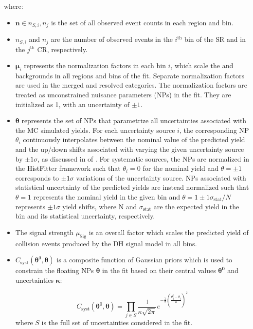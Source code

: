 where:

\begin{itemize}
    \item \(\boldsymbol{n}\in{n_{S,i}, n_j}\) is the set of all observed event counts in each region and bin.
    \item \(n_{S,i}\) and \(n_j\) are the number of observed events in the \(i^\text{th}\) bin of the SR and in the \(j^\text{th}\) CR, respectively.
    \item \(\boldsymbol{\mu}_i\) represents the normalization factors in each bin \(i\), which scale the \wjets and \ttbar backgrounds in all regions and bins of the fit. Separate normalization factors are used in the merged and resolved categories. The normalization factors are treated as unconstrained nuisance parameters (NPs) in the fit. They are initialized as 1, with an uncertainty of \(\pm1\).  
    \item \(\boldsymbol{\theta}\) represents the set of NPs that parametrize all uncertainties associated with the MC simulated yields. For each uncertainty source \(i\), the corresponding NP \(\theta_i\) continuously interpolates between the nominal value of the predicted yield and the up/down shifts associated with varying the given uncertainty source by \(\pm1\sigma\), as discussed in  of . For systematic sources, the NPs are normalized in the HistFitter framework such that \(\theta_i=0\) for the nominal yield and \(\theta=\pm1\) corresponds to \(\pm1\sigma\) variations of the uncertainty source. NPs associated with statistical uncertainty of the predicted yields are instead normalized such that \(\theta=1\) represents the nominal yield in the given bin and \(\theta=1\pm1\sigma_\text{stat}/N\) represents \(\pm1\sigma\) yield shifts, where N and \(\sigma_\text{stat}\) are the expected yield in the bin and its statistical uncertainty, respectively. 
    \item The signal strength \(\mu_\text{Sig}\) is an overall factor which scales the predicted yield of collision events produced by the DH signal model in all bins.
    \item \(C_\text{syst}(\boldsymbol{\theta}^0, \boldsymbol{\theta})\) is a composite function of Gaussian priors which is used to constrain the floating NPs \(\boldsymbol{\theta}\) in the fit based on their central values \(\boldsymbol{\theta^0}\) and uncertainties \(\boldsymbol{\kappa}\):

    \begin{equation}
    \label{eq:gaussian_np}
    C_\text{syst}(\boldsymbol{\theta}^0, \boldsymbol{\theta})= \prod_{j\in S} \frac{1}{\kappa\sqrt{2\pi}}e^{-\frac{1}{2}(\frac{\theta^0_j-\theta_j}{\kappa})^2}
    \end{equation}
    \noindent where \(S\) is the full set of uncertainties considered in the fit.
    

\end{itemize}
